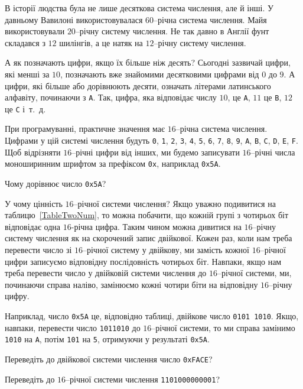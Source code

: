 \documentclass{book}
\newcommand{\bitstr}[1]{{\tt #1}}
\newcommand{\hexstr}[1]{{\tt 0x#1}}
\newcommand{\hexdesc}{ми будемо записувати $16$--річні числа моноширинним шрифтом за префіксом {\tt 0x}, наприклад \hexstr{5A}}
\begin{document}
В історії людства була не лише десяткова система числення, але й інші.
У давньому Вавилоні використовувалася $60$--річна система числення.
Майя використовували $20$--річну систему числення.
Не так давно в Англії фунт складався з $12$ шилінгів, а це натяк на $12$--річну систему числення.

А як позначають цифри, якщо їх більше ніж десять?
Сьогодні зазвичай цифри, які менші за $10$, позначають вже знайомими десятковими цифрами від $0$ до $9$.
А цифри, які більше або дорівнюють десяти, означать літерами латинського алфавіту, починаючи з \bitstr{A}.
Так, цифра, яка відповідає числу $10$, це \bitstr{A}, $11$ це \bitstr{B}, $12$ це \bitstr{C} і~т.~д.

При програмуванні, практичне значення має $16$--річна система числення.
Цифрами у цій системі числення будуть \bitstr{0}, \bitstr{1}, \bitstr{2}, \bitstr{3}, \bitstr{4}, \bitstr{5}, \bitstr{6}, \bitstr{7}, \bitstr{8}, \bitstr{9}, \bitstr{A}, \bitstr{B}, \bitstr{C}, \bitstr{D}, \bitstr{E}, \bitstr{F}.
Щоб відрізняти $16$--річні цифри від інших, \hexdesc.

\begin{exercise}
Чому дорівнює число \hexstr{5A}?
\end{exercise}

У чому цінність $16$--річної системи числення?
Якщо уважно подивитися на таблицю~\ref{TableTwoNum}, то можна побачити, що кожній групі з чотирьох біт відповідає одна $16$-річна цифра.
Таким чином можна дивитися на $16$--річну систему числення як на скорочений запис двійкової.
Кожен раз, коли нам треба перевести число зі $16$--річної систему у двійкову, ми замість кожної $16$--річної цифри записуємо відповідну послідовність чотирьох біт.
Навпаки, якщо нам треба перевести число у двійковій системи числення до $16$--річної системи, ми, починаючи справа наліво, замінюємо кожні чотири біти на відповідну $16$--річну цифру.

Наприклад, число \hexstr{5A} це, відповідно таблиці, двійкове число \bitstr{0101~1010}.
Якщо, навпаки,  перевести число \bitstr{1011010} до $16$--річної системи, то ми справа замінимо \bitstr{1010} на \bitstr{A}, потім \bitstr{101} на \bitstr{5}, отримуючи у результаті \hexstr{5A}.

\begin{exercise}
Переведіть до двійкової системи числення число \hexstr{FACE}?
\end{exercise}

\begin{exercise}
Переведіть до $16$--річної системи числення \bitstr{1101000000001}?
\end{exercise}
\end{document}

